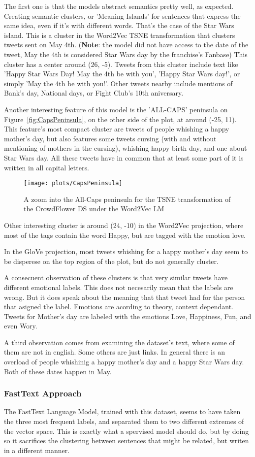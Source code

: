 The first one is that the models abstract semantics pretty well, as expected. Creating semantic clusters, or 'Meaning Islands' for sentences that express the same idea, even if it's with different words. That's the case of the Star Wars island. This is a cluster in the Word2Vec TSNE transformation that clusters tweets sent on May 4th. (\textbf{Note}: the model did not have access to the date of the tweet, May the 4th is considered Star Wars day by the franchise's Fanbase) This cluster has a center around (26, -5). Tweets from this cluster include text like 'Happy Star Wars Day! May the 4th be with you', 'Happy Star Wars day!', or simply 'May the 4th be with you!'. Other tweets nearby include mentions of Bank's day, National days, or Fight Club's 10th aniversary.

Another interesting feature of this model is the 'ALL-CAPS' peninsula on Figure~\ref{fig:CapsPeninsula}, on the other side of the plot, at around (-25, 11). This feature's most compact cluster are tweets of people whishing a happy mother's day, but also features some tweets cursing (with and without mentioning of mothers in the cursing), whishing happy birth day, and one about Star Wars day. All these tweets have in common that at least some part of it is written in all capital letters.

\begin{figure}[H]
  \texttt{[image: plots/CapsPeninsula]}
  \centering
  \caption{A zoom into the All-Caps peninsula for the TSNE transformation of the CrowdFlower DS under the Word2Vec LM}
\end{figure}\label{fig:CapsPeninsula}

Other interesting cluster is around (24, -10) in the Word2Vec projection, where most of the tags contain the word Happy, but are tagged with the emotion love.

In the GloVe projection, most tweets whishing for a happy mother's day seem to be disperese on the top region of the plot, but do not generally cluster.

A consecuent observation of these clusters is that very similar tweets have different emotional labels. This does not necesarily mean that the labels are wrong. But it does speak about the meaning that that tweet had for the person that asigned the label. Emotions are acording to theory, context dependant. Tweets for Mother's day are labeled with the emotions Love, Happiness, Fun, and even Wory.

A third observation comes from examining the dataset's text, where some of them are not in english. Some others are just links. In general there is an overload of people whishinig a happy mother's day and a happy Star Wars day. Both of these dates happen in May.

\subsubsection{FastText Approach}
The FastText Language Model, trained with this dataset, seems to have taken the three most frequent labels, and separated them to two different extremes of the vector space. This is exactly what a spervised model should do, but by doing so it sacrifices the clustering between sentences that might be related, but writen in a different manner.
